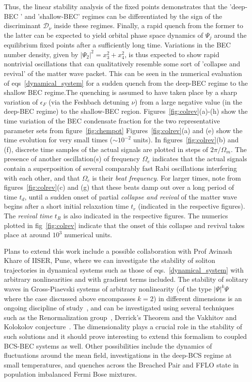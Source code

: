 \documentclass[a4paper,10pt]{report}
\begin{document}
Thus, the linear stability analysis of the fixed points demonstrates that the 'deep-BEC ' and 'shallow-BEC' regimes can be differentiated by the sign of the discriminant $\mathcal{D}_\nu$ inside these regimes. Finally, a rapid quench from the former to the latter can be expected to yield orbital phase space dynamics of $\Psi_j$ around the equilibrium fixed points after a sufficiently long time. Variations in the BEC number density, given by $|\Psi_2|^2 = x^2_3 + x^2_4$, is thus expected to show rapid nontrivial oscillations that can qualitatively resemble some sort of 'collapse and revival' of the matter wave packet. This can be seen in the numerical evaluation of eqs\ \ref{dynamical_system} for a sudden quench from the deep-BEC regime to the shallow BEC regime.The quenching is assumed to have taken place by a sharp variation of $\epsilon_F$ (via the Feshbach detuning $\nu$) from a large negative value (in the deep-BEC regime) to the shallow-BEC region. Figures~\ref{fig:colrev}(a)-(h) show the time variation 
of the BEC condensate fraction for the two representative parameter sets from figure~\ref{fig:chempot}  Figures~\ref{fig:colrev}(a) and (e) show the time evolution for very small times ($ \sim 10^{-2}$ units). In figures~\ref{fig:colrev}(b) and (f), discrete time samples of the actual signals are plotted in steps of $2\pi/\Omega_m$. The presence of another oscillation(s) of frequency $\Omega_e$ indicates that the actual signals contain a superposition of several comparably fast Rabi oscillations interfering with each other, and that $\Omega_e$ is their \textit{beat frequency}. For larger times, note from figures~\ref{fig:colrev}(c) and (g) that these beats damp out over a long period of time $t_d$, until a sudden onset of partial \textit{collapse and revival} of the matter wave begins after a short initial relaxation time $t_r$ (indicated in the respective figures). The \textit{revival time} $t_R$ is also indicated in the respective figures. The numerics plotted in fig~\ref{fig:colrev} indicate that the 
onset of this collapse and revival takes place at around $10^3$ numerical units. 

Plans to extend this work include a possible collaboration with Prof Avinash Khare of IISER, Pune, where we can investigate the stability of soliton trajectories in dynamical systems such as those of eqs.\ \ref{dynamical_system} with arbitrary nonlinearities and with gradient terms included. The stability of solitary waves in Gross-Piaevski systems of arbitrary nonlinearity (of the type $|\Psi|^k \Psi$ where the case discussed above encompasses $k=2$) in different dimensions is an ongoing discipline of study~\cite{khare}, and can be investigated using several techniques such as the Renormalization group~\cite{khare}, Derrick's Theorem and the Vakhitov and Kolokolov conjecture~\cite{derrick:vak}. The dimensionality plays a crucial role in the stability of such solutions and it should prove interesting to extend this formalism to coupled BCS-BEC systems as well. Other possibilities include the dynamics of fluctuations around the mean field, investigations in the deep-BCS regime at small temperatures, and 
quenches across the Breached Pair and FFLO state in population imbalanced Fermi Bose mixtures.
\end{document}
